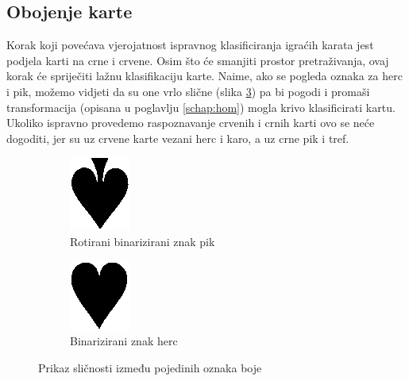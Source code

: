\documentclass[times, zavrsni, numeric, utf8]{fer}
\begin{document}
\subsection{Obojenje karte}
\label{schap:colordet}
\hspace*{0.5cm}Korak koji povećava vjerojatnost ispravnog klasificiranja igraćih karata jest podjela karti na crne i crvene. Osim što će smanjiti prostor pretraživanja, ovaj korak će spriječiti lažnu klasifikaciju karte. Naime, ako se pogleda oznaka za herc i pik, možemo vidjeti da su one vrlo slične (slika \ref{fig:hercpik}) pa bi pogodi i promaši transformacija (opisana u poglavlju \ref{schap:hom}) mogla krivo klasificirati kartu. Ukoliko ispravno provedemo raspoznavanje crvenih i crnih karti ovo se neće dogoditi, jer su uz crvene karte vezani herc i karo, a uz crne pik i tref. 
\begin{figure}[H]
\begin{subfigure}{.5\textwidth}
  \centering
  \includegraphics[width=.2\linewidth]{simboli/spade_flipped.png}
  \caption{Rotirani binarizirani znak pik}
  \label{fig:sf}
\end{subfigure}%
\begin{subfigure}{.5\textwidth}
  \centering
  \includegraphics[width=.2\linewidth]{simboli/heart.png}
  \caption{Binarizirani znak herc}
  \label{fig:herc}
\end{subfigure}
\caption{Prikaz sličnosti između pojedinih oznaka boje}
\label{fig:hercpik}
\end{figure} 
\end{document}
